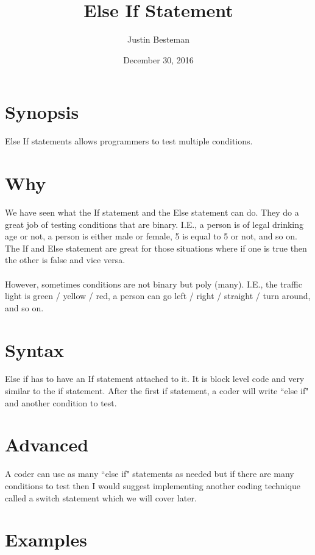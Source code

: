 \documentclass[12pt, letterpaper]{article}
\title{Else If Statement}
\author{Justin Besteman}
\date{December 30, 2016}
\begin{document}
\maketitle


\section*{Synopsis}

Else If statements allows programmers to test multiple conditions.

\section*{Why}

We have seen what the If statement and the Else statement can do. They do a great job of testing conditions that are binary. I.E., a person is of legal drinking age or not, a person is either male or female, 5 is equal to 5 or not, and so on. The If and Else statement are great for those situations where if one is true then the other is false and vice versa. \\ \\
However, sometimes conditions are not binary but poly (many). I.E., the traffic light is green / yellow / red, a person can go left / right / straight / turn around, and so on. \\

\section*{Syntax}

Else if has to have an If statement attached to it. It is block level code and very similar to the if statement. After the first if statement, a coder will write ``else if" and another condition to test.

\section*{Advanced}

A coder can use as many ``else if" statements as needed but if there are many conditions to test then I would suggest implementing another coding technique called a switch statement which we will cover later.

\section*{Examples}
\end{document}
